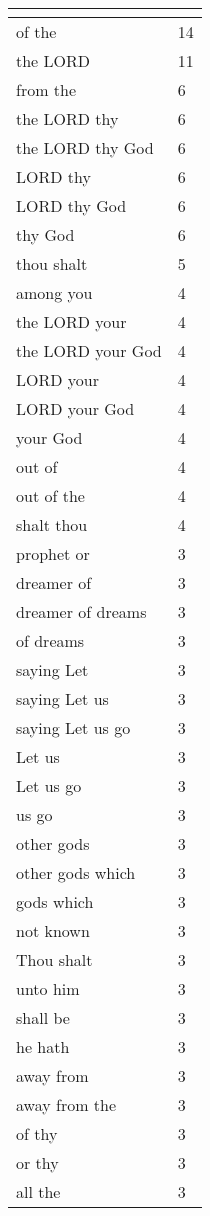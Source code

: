 \begin{center}
\begin{longtable}{|p{3.0in}|p{0.5in}|}
\hline \multicolumn{2}{c}{{ }} \\ \hline
\endfoot 
of the & 14\\ \hline 
the LORD & 11\\ \hline 
from the & 6\\ \hline 
the LORD thy & 6\\ \hline 
the LORD thy God & 6\\ \hline 
LORD thy & 6\\ \hline 
LORD thy God & 6\\ \hline 
thy God & 6\\ \hline 
thou shalt & 5\\ \hline 
among you & 4\\ \hline 
the LORD your & 4\\ \hline 
the LORD your God & 4\\ \hline 
LORD your & 4\\ \hline 
LORD your God & 4\\ \hline 
your God & 4\\ \hline 
out of & 4\\ \hline 
out of the & 4\\ \hline 
shalt thou & 4\\ \hline 
prophet or & 3\\ \hline 
dreamer of & 3\\ \hline 
dreamer of dreams & 3\\ \hline 
of dreams & 3\\ \hline 
saying Let & 3\\ \hline 
saying Let us & 3\\ \hline 
saying Let us go & 3\\ \hline 
Let us & 3\\ \hline 
Let us go & 3\\ \hline 
us go & 3\\ \hline 
other gods & 3\\ \hline 
other gods which & 3\\ \hline 
gods which & 3\\ \hline 
not known & 3\\ \hline 
Thou shalt & 3\\ \hline 
unto him & 3\\ \hline 
shall be & 3\\ \hline 
he hath & 3\\ \hline 
away from & 3\\ \hline 
away from the & 3\\ \hline 
of thy & 3\\ \hline 
or thy & 3\\ \hline 
all the & 3\\ \hline 
\end{longtable}
\end{center}






